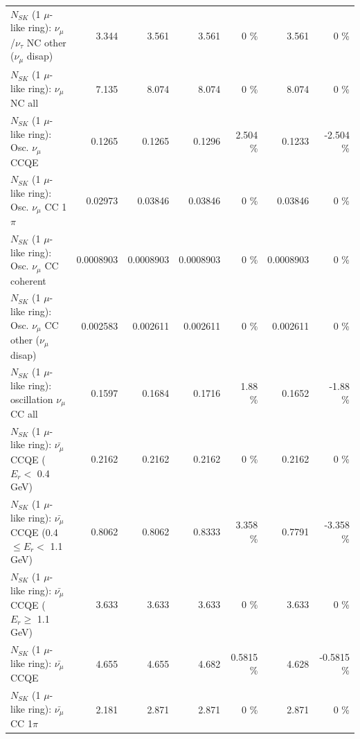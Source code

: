 \begin{table}
\begin{tabular}{| l | r | r | r  r | r  r |}
   $N_{SK}$ (1 $\mu$-like ring): $\nu_\mu$/$\nu_\tau$ NC other ($\nu_\mu$ disap) &           3.344 &           3.561 &           3.561 &        0 \%  &           3.561 &        0 \%  \\ 
                                $N_{SK}$ (1 $\mu$-like ring): $\nu_{\mu}$ NC all &           7.135 &           8.074 &           8.074 &        0 \%  &           8.074 &        0 \%  \\ 
\hline
\hline
                               $N_{SK}$ (1 $\mu$-like ring): Osc. $\nu_\mu$ CCQE &          0.1265 &          0.1265 &          0.1296 &    2.504 \%  &          0.1233 &   -2.504 \%  \\ 
                          $N_{SK}$ (1 $\mu$-like ring): Osc. $\nu_\mu$ CC 1$\pi$ &         0.02973 &         0.03846 &         0.03846 &        0 \%  &         0.03846 &        0 \%  \\ 
                        $N_{SK}$ (1 $\mu$-like ring): Osc. $\nu_\mu$ CC coherent &       0.0008903 &       0.0008903 &       0.0008903 &        0 \%  &       0.0008903 &        0 \%  \\ 
         $N_{SK}$ (1 $\mu$-like ring): Osc. $\nu_\mu$ CC other ($\nu_\mu$ disap) &        0.002583 &        0.002611 &        0.002611 &        0 \%  &        0.002611 &        0 \%  \\ 
                      $N_{SK}$ (1 $\mu$-like ring): oscillation $\nu_\mu$ CC all &          0.1597 &          0.1684 &          0.1716 &     1.88 \%  &          0.1652 &    -1.88 \%  \\ 
\hline
\hline
          $N_{SK}$ (1 $\mu$-like ring): $\bar{\nu_\mu}$ CCQE ($E_{r} <$ 0.4 GeV) &          0.2162 &          0.2162 &          0.2162 &        0 \%  &          0.2162 &        0 \%  \\ 
 $N_{SK}$ (1 $\mu$-like ring): $\bar{\nu_\mu}$ CCQE (0.4 $\leq E_{r} <$ 1.1 GeV) &          0.8062 &          0.8062 &          0.8333 &    3.358 \%  &          0.7791 &   -3.358 \%  \\ 
       $N_{SK}$ (1 $\mu$-like ring): $\bar{\nu_\mu}$ CCQE ($E_{r} \geq$ 1.1 GeV) &           3.633 &           3.633 &           3.633 &        0 \%  &           3.633 &        0 \%  \\ 
\hline
                              $N_{SK}$ (1 $\mu$-like ring): $\bar{\nu_\mu}$ CCQE &           4.655 &           4.655 &           4.682 &   0.5815 \%  &           4.628 &  -0.5815 \%  \\ 
                         $N_{SK}$ (1 $\mu$-like ring): $\bar{\nu_\mu}$ CC 1$\pi$ &           2.181 &           2.871 &           2.871 &        0 \%  &           2.871 &        0 \%  \\ 

\end{tabular}
\end{table}
